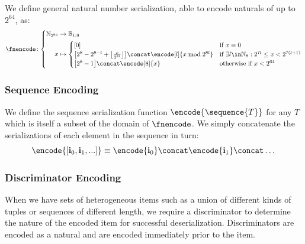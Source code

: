 We define general natural number serialization, able to encode naturals of up to $2^{64}$, as:
\begin{equation}
  \fnencode\colon\abracegroup{
    \Nbits{64} &\to \blob[1:9] \\
    x &\mapsto \begin{cases}
     \sq{0} &\when x = 0 \\
      \sq{2^8-2^{8-l} + \ffrac{x}{2^{8l}}} \concat \encode[l]{x \bmod 2^{8l}} &\when \exists l \in \N_8 : 2^{7l} \le x < 2^{7(l+1)} \\
     \sq{2^8-1} \concat \encode[8]{x} &\otherwhen x < 2^{64} \\
    \end{cases}
  }
\end{equation}

\subsubsection{Sequence Encoding}
We define the sequence serialization function $\encode{\sequence{T}}$ for any $T$ which is itself a subset of the domain of $\fnencode$. We simply concatenate the serializations of each element in the sequence in turn:
\begin{equation}
  \encode{[\mathbf{i}_0, \mathbf{i}_1, ...]} \equiv \encode{\mathbf{i}_0} \concat \encode{\mathbf{i}_1} \concat \dots
\end{equation}

\subsubsection{Discriminator Encoding}\label{sec:discriminators}
When we have sets of heterogeneous items such as a union of different kinds of tuples or sequences of different length, we require a discriminator to determine the nature of the encoded item for successful deserialization. Discriminators are encoded as a natural and are encoded immediately prior to the item.

